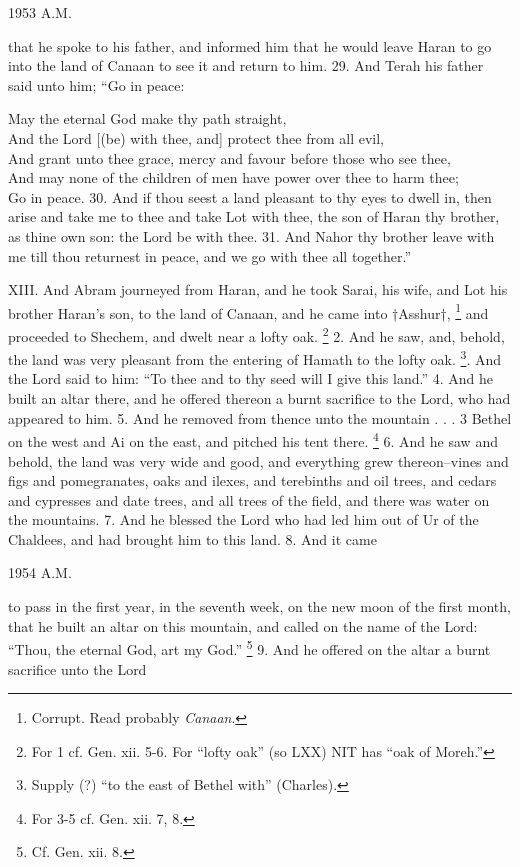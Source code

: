 1953 A.M.

that he spoke to his father, and informed him that he would leave Haran to go into the land of Canaan to see it and return to him. 29. And Terah his father said unto him; ``Go in peace:

May the eternal God make thy path straight,\\
And the Lord [(be) with thee, and] protect thee from all evil,\\
And grant unto thee grace, mercy and favour before those who see thee,\\
And may none of the children of men have power over thee to harm thee;\\
Go in peace. 30. And if thou seest a land pleasant to thy eyes to dwell in, then arise and take me to thee and take Lot with thee, the son of Haran thy brother, as thine own son: the Lord be with thee. 31. And Nahor thy brother leave with me till thou returnest in peace, and we go with thee all together.''


XIII. And Abram journeyed from Haran, and he took Sarai, his wife, and Lot his brother Haran's son, to the land of Canaan, and he came into †Asshur†, \footnote{Corrupt. Read probably \emph{Canaan}.} and proceeded to Shechem, and dwelt near a lofty oak. \footnote{For 1 cf. Gen. xii. 5-6. For ``lofty oak'' (so LXX) NIT has ``oak of Moreh.''} 2. And he saw, and, behold, the land was very pleasant from the entering of Hamath to the lofty oak. \footnote{Supply (?) ``to the east of Bethel with'' (Charles).}. And the Lord said to him: ``To thee and to thy seed will I give this land.'' 4. And he built an altar there, and he offered thereon a burnt sacrifice to the Lord, who had appeared to him. 5. And he removed from thence unto the mountain . . . 3 Bethel on the west and Ai on the east, and pitched his tent there. \footnote{For 3-5 cf. Gen. xii. 7, 8.} 6. And he saw and behold, the land was very wide and good, and everything grew thereon--vines and figs and pomegranates, oaks and ilexes, and terebinths and oil trees, and cedars and cypresses and date trees, and all trees of the field, and there was water on the mountains. 7. And he blessed the Lord who had led him out of Ur of the Chaldees, and had brought him to this land. 8. And it came

1954 A.M.

to pass in the first year, in the seventh week, on the new moon of the first month, that he built an altar on this mountain, and called on the name of the Lord: ``Thou, the eternal God, art my God.'' \footnote{Cf. Gen. xii. 8.} 9. And he offered on the altar a burnt sacrifice unto the Lord

